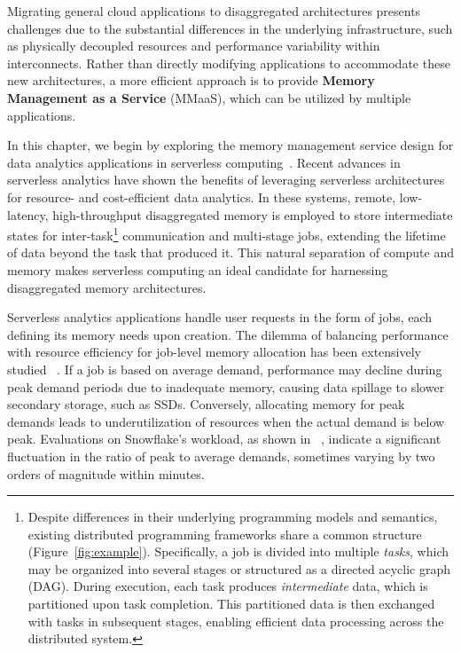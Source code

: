 Migrating general cloud applications to disaggregated architectures presents challenges due to the substantial differences in the underlying infrastructure, such as physically decoupled resources and performance variability within interconnects. Rather than directly modifying applications to accommodate these new architectures, a more efficient approach is to provide \textbf{Memory Management as a Service} (MMaaS), which can be utilized by multiple applications. 

In this chapter, we begin by exploring the memory management service design for data analytics applications in serverless computing~\cite{starling, locus, pocket, flint, sparkonlambda, cirrus, excamera, pywren, numpywren, gg, athena, aurora, azuresqldw, cloudburst, snowset, caerus}. Recent advances in serverless analytics have shown the benefits of leveraging serverless architectures for resource- and cost-efficient data analytics. In these systems, remote, low-latency, high-throughput disaggregated memory is employed to store intermediate states for inter-task\footnote{Despite differences in their underlying programming models and semantics, existing distributed programming frameworks share a common structure (Figure~\ref{fig:example}). Specifically, a job is divided into multiple \textit{tasks}, which may be organized into several stages or structured as a directed acyclic graph (DAG). During execution, each task produces \textit{intermediate} data, which is partitioned upon task completion. This partitioned data is then exchanged with tasks in subsequent stages, enabling efficient data processing across the distributed system.} communication and multi-stage jobs, extending the lifetime of data beyond the task that produced it. This natural separation of compute and memory makes serverless computing an ideal candidate for harnessing disaggregated memory architectures.


Serverless analytics applications\cite{starling, shuffling, pocket, cirrus} handle user requests in the form of jobs, each defining its memory needs upon creation. The dilemma of balancing performance with resource efficiency for job-level memory allocation has been extensively studied ~\cite{elasticquery, qoop}. If a job is based on average demand, performance may decline during peak demand periods due to inadequate memory, causing data spillage to slower secondary storage, such as SSDs. Conversely, allocating memory for peak demands leads to underutilization of resources when the actual demand is below peak. Evaluations on Snowflake's workload, as shown in ~\cite{elasticquery}, indicate a significant fluctuation in the ratio of peak to average demands, sometimes varying by two orders of magnitude within minutes.

